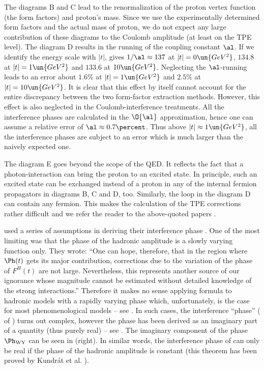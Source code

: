
The diagrams  B and C lead to the renormalization of the proton vertex function (the form factors) and proton's mass. Since we use the experimentally determined form factors and the actual mass of proton, we do not expect any large contribution of these diagrams to the Coulomb amplitude (at least on the TPE level). The diagram D results in the running of the coupling constant $\al$. If we identify the energy scale with $|t|$,  gives $1/\al \approx 137$ at $|t| = 0\un{GeV^2}$, $134.8$ at $|t| = 1 \un{GeV^2}$ and $133.6$ at $10\un{GeV^2}$. Neglecting the $\al$-running leads to an error about $1.6\percent$ at $|t| = 1 \un{GeV^2}$ and $2.5\percent$ at $|t| = 10 \un{GeV^2}$. It is clear that this effect by itself cannot account for the entire discrepancy between the two form-factor extraction methods. However, this effect is also neglected in the Coulomb-interference treatments. All the interference phases are calculated in the $\O{\al}$ approximation, hence one can assume a relative error of $\al\approx 0.7\percent$. Thus above $|t| \approx 1\un{GeV^2}$, all the interference phases are subject to an error which is much larger than the naively expected one.

The diagram E goes beyond the scope of the QED. It reflects the fact that a photon-interaction can bring the proton to an excited state. In principle, such an excited state can be exchanged instead of a proton in any of the internal fermion propagators in diagrams B, C and D, too. Similarly, the loop in the diagram D can contain any fermion. This makes the calculation of the TPE corrections rather difficult and we refer the reader to the above-quoted papers .

\WaY{} used a series of assumptions in deriving their interference phase . One of the most limiting was that the phase of the hadronic amplitude is a slowly varying function only. They wrote: ``One can hope, therefore, that in the region where $\Ph(t)$ gets its major contribution, corrections due to the variation of the phase of $F^H(t)$ are not large. Nevertheless, this represents another source of our ignorance whose magnitude cannot be estimated without detailed knowledge of the strong interactions.'' Therefore it makes no sense applying \WaY{} formula to hadronic models with a rapidly varying phase which, unfortunately, is the case for most phenomenological models -- see . In such cases, the interference ``phase'' (\rhs{} of ) turns out complex, however the phase has been derived as an imaginary part of a quantity (thus purely real) -- see . The imaginary component of the phase $\Ph_{\rm WY}$ can be seen in  (right). In similar words, the interference phase of \WaY{} can only be real if the phase of the hadronic amplitude is constant (this theorem has been proved by Kundr\' at et al. ).

